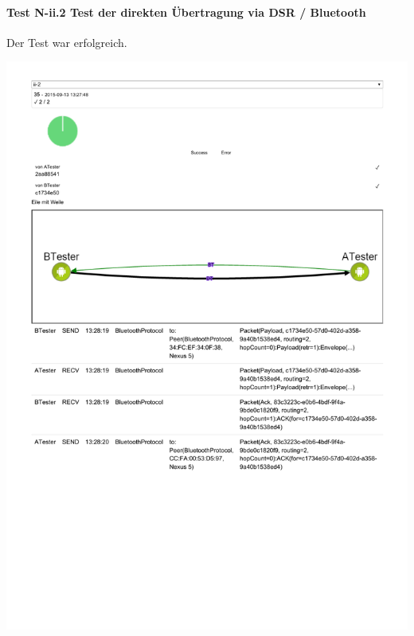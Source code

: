 \clearpage

\paragraph{Test N-ii.2 Test der direkten Übertragung via DSR / Bluetooth}

Der Test war erfolgreich.

\includegraphics[trim=0 200 0 0,clip,scale=0.8]{belege/manuelle-tests/netzwerk/Dashboardauszuege/Netzwerktest_n-ii-2a.pdf}
\clearpage

